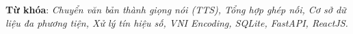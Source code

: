 \documentclass[13pt,a4paper]{extarticle}
\begin{document}
\vspace{6pt}
\noindent\textbf{Từ khóa}: \textit{Chuyển văn bản thành giọng nói (TTS), Tổng hợp ghép nối, Cơ sở dữ liệu đa phương tiện, Xử lý tín hiệu số, VNI Encoding, SQLite, FastAPI, ReactJS.}

\vspace{12pt}







\end{document}
